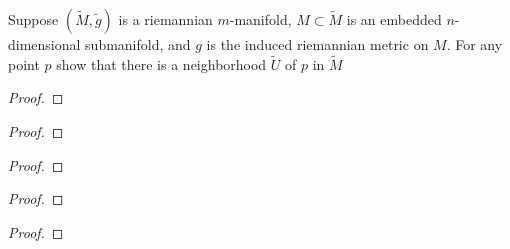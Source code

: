 \begin{problem}
Suppose $(\tilde M,\tilde g)$ is a riemannian $m$-manifold, $M\subset\tilde
M$ is an embedded $n$-dimensional submanifold, and $g$ is the induced
riemannian metric on $M$. For any point $p$ show that there is a
neighborhood $\tilde U$ of $p$ in $\tilde M$
\end{problem}
\begin{proof}
\end{proof}
\newpage

\begin{problem}
\end{problem}
\begin{proof}
\end{proof}
\newpage

\begin{problem}
\end{problem}
\begin{proof}
\end{proof}
\newpage

\begin{problem}
\end{problem}
\begin{proof}
\end{proof}
\newpage

\begin{problem}
\end{problem}
\begin{proof}
\end{proof}

